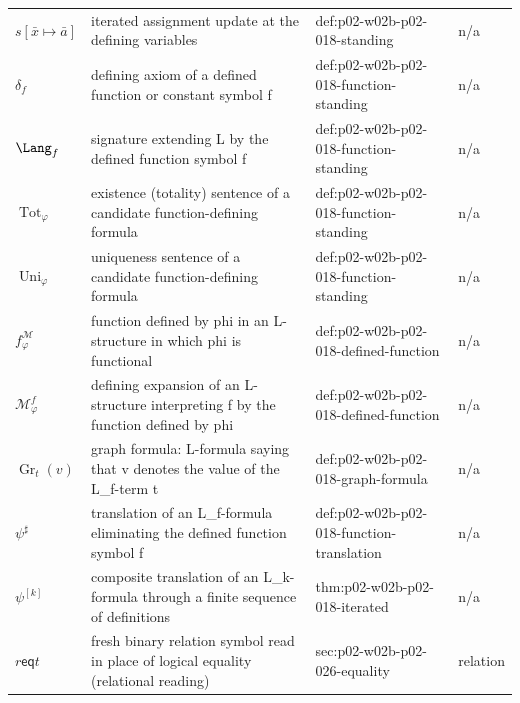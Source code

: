 \begin{longtable}{@{}p{}p{}p{}p{}@{}}
\(s[\bar x\mapsto\bar a]\) & iterated assignment update at the defining variables & def:\allowbreak{}p02-\allowbreak{}w02b-\allowbreak{}p02-\allowbreak{}018-\allowbreak{}standing & n/a \\
\(\delta_f\) & defining axiom of a defined function or constant symbol f & def:\allowbreak{}p02-\allowbreak{}w02b-\allowbreak{}p02-\allowbreak{}018-\allowbreak{}function-\allowbreak{}standing & n/a \\
\(\Lang_f\) & signature extending L by the defined function symbol f & def:\allowbreak{}p02-\allowbreak{}w02b-\allowbreak{}p02-\allowbreak{}018-\allowbreak{}function-\allowbreak{}standing & n/a \\
\(\operatorname{Tot}_{\varphi}\) & existence (totality) sentence of a candidate function-defining formula & def:\allowbreak{}p02-\allowbreak{}w02b-\allowbreak{}p02-\allowbreak{}018-\allowbreak{}function-\allowbreak{}standing & n/a \\
\(\operatorname{Uni}_{\varphi}\) & uniqueness sentence of a candidate function-defining formula & def:\allowbreak{}p02-\allowbreak{}w02b-\allowbreak{}p02-\allowbreak{}018-\allowbreak{}function-\allowbreak{}standing & n/a \\
\(f^{\mathcal M}_{\varphi}\) & function defined by phi in an L-structure in which phi is functional & def:\allowbreak{}p02-\allowbreak{}w02b-\allowbreak{}p02-\allowbreak{}018-\allowbreak{}defined-\allowbreak{}function & n/a \\
\(\mathcal M^{f}_{\varphi}\) & defining expansion of an L-structure interpreting f by the function defined by phi & def:\allowbreak{}p02-\allowbreak{}w02b-\allowbreak{}p02-\allowbreak{}018-\allowbreak{}defined-\allowbreak{}function & n/a \\
\(\operatorname{Gr}_{t}(v)\) & graph formula: L-formula saying that v denotes the value of the L\_f-term t & def:\allowbreak{}p02-\allowbreak{}w02b-\allowbreak{}p02-\allowbreak{}018-\allowbreak{}graph-\allowbreak{}formula & n/a \\
\(\psi^{\sharp}\) & translation of an L\_f-formula eliminating the defined function symbol f & def:\allowbreak{}p02-\allowbreak{}w02b-\allowbreak{}p02-\allowbreak{}018-\allowbreak{}function-\allowbreak{}translation & n/a \\
\(\psi^{[k]}\) & composite translation of an L\_k-formula through a finite sequence of definitions & thm:\allowbreak{}p02-\allowbreak{}w02b-\allowbreak{}p02-\allowbreak{}018-\allowbreak{}iterated & n/a \\
\(r\mathrel{\mathsf{eq}}t\) & fresh binary relation symbol read in place of logical equality (relational reading) & sec:\allowbreak{}p02-\allowbreak{}w02b-\allowbreak{}p02-\allowbreak{}026-\allowbreak{}equality & relation \\

\end{longtable}
